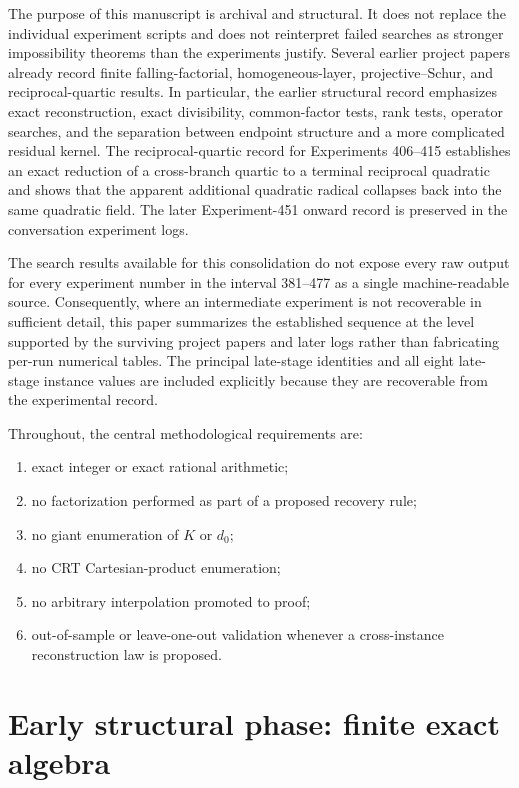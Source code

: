 \documentclass[11pt,a4paper]{article}
\begin{document}
The purpose of this manuscript is archival and structural. It does not replace the individual experiment scripts and does not reinterpret failed searches as stronger impossibility theorems than the experiments justify. Several earlier project papers already record finite falling-factorial, homogeneous-layer, projective--Schur, and reciprocal-quartic results. In particular, the earlier structural record emphasizes exact reconstruction, exact divisibility, common-factor tests, rank tests, operator searches, and the separation between endpoint structure and a more complicated residual kernel. The reciprocal-quartic record for Experiments 406--415 establishes an exact reduction of a cross-branch quartic to a terminal reciprocal quadratic and shows that the apparent additional quadratic radical collapses back into the same quadratic field. The later Experiment-451 onward record is preserved in the conversation experiment logs.

The search results available for this consolidation do not expose every raw output for every experiment number in the interval 381--477 as a single machine-readable source. Consequently, where an intermediate experiment is not recoverable in sufficient detail, this paper summarizes the established sequence at the level supported by the surviving project papers and later logs rather than fabricating per-run numerical tables. The principal late-stage identities and all eight late-stage instance values are included explicitly because they are recoverable from the experimental record.

Throughout, the central methodological requirements are:
\begin{enumerate}[leftmargin=*]
\item exact integer or exact rational arithmetic;
\item no factorization performed as part of a proposed recovery rule;
\item no giant enumeration of $K$ or $d_0$;
\item no CRT Cartesian-product enumeration;
\item no arbitrary interpolation promoted to proof;
\item out-of-sample or leave-one-out validation whenever a cross-instance reconstruction law is proposed.
\end{enumerate}

\section{Early structural phase: finite exact algebra}
\end{document}
